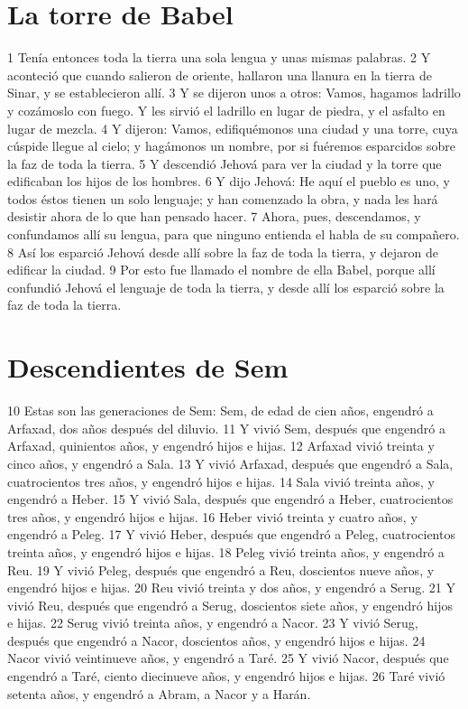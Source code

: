 \section{La torre de Babel}

1 Tenía entonces toda la tierra una sola lengua y unas mismas palabras.
2 Y aconteció que cuando salieron de oriente, hallaron una llanura en la tierra de Sinar, y se establecieron allí.
3 Y se dijeron unos a otros: Vamos, hagamos ladrillo y cozámoslo con fuego. Y les sirvió el ladrillo en lugar de piedra, y el asfalto en lugar de mezcla.
4 Y dijeron: Vamos, edifiquémonos una ciudad y una torre, cuya cúspide llegue al cielo; y hagámonos un nombre, por si fuéremos esparcidos sobre la faz de toda la tierra.
5 Y descendió Jehová para ver la ciudad y la torre que edificaban los hijos de los hombres.
6 Y dijo Jehová: He aquí el pueblo es uno, y todos éstos tienen un solo lenguaje; y han comenzado la obra, y nada les hará desistir ahora de lo que han pensado hacer.
7 Ahora, pues, descendamos, y confundamos allí su lengua, para que ninguno entienda el habla de su compañero.
8 Así los esparció Jehová desde allí sobre la faz de toda la tierra, y dejaron de edificar la ciudad.
9 Por esto fue llamado el nombre de ella Babel, porque allí confundió Jehová el lenguaje de toda la tierra, y desde allí los esparció sobre la faz de toda la tierra.

\section{Descendientes de Sem}

10 Estas son las generaciones de Sem: Sem, de edad de cien años, engendró a Arfaxad, dos años después del diluvio.
11 Y vivió Sem, después que engendró a Arfaxad, quinientos años, y engendró hijos e hijas.
12 Arfaxad vivió treinta y cinco años, y engendró a Sala.
13 Y vivió Arfaxad, después que engendró a Sala, cuatrocientos tres años, y engendró hijos e hijas.
14 Sala vivió treinta años, y engendró a Heber.
15 Y vivió Sala, después que engendró a Heber, cuatrocientos tres años, y engendró hijos e hijas.
16 Heber vivió treinta y cuatro años, y engendró a Peleg.
17 Y vivió Heber, después que engendró a Peleg, cuatrocientos treinta años, y engendró hijos e hijas.
18 Peleg vivió treinta años, y engendró a Reu.
19 Y vivió Peleg, después que engendró a Reu, doscientos nueve años, y engendró hijos e hijas.
20 Reu vivió treinta y dos años, y engendró a Serug.
21 Y vivió Reu, después que engendró a Serug, doscientos siete años, y engendró hijos e hijas.
22 Serug vivió treinta años, y engendró a Nacor.
23 Y vivió Serug, después que engendró a Nacor, doscientos años, y engendró hijos e hijas.
24 Nacor vivió veintinueve años, y engendró a Taré.
25 Y vivió Nacor, después que engendró a Taré, ciento diecinueve años, y engendró hijos e hijas.
26 Taré vivió setenta años, y engendró a Abram, a Nacor y a Harán.

